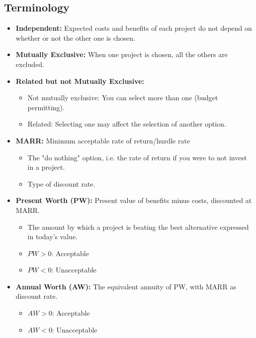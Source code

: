 \subsection{Terminology}
\begin{terminology}
    \begin{itemize}
        \item \textbf{Independent:} Expected costs and benefits of each project do not depend on whether or not the other one is chosen.
        
        \item \textbf{Mutually Exclusive:} When one project is chosen, all the others are excluded.
        
        \item \textbf{Related but not Mutually Exclusive:}
            \begin{itemize}
                \item Not mutually exclusive: You can select more than one (budget permitting).
                \item Related: Selecting one may affect the selection of another option.
            \end{itemize}
        
        \item \textbf{MARR:} Minimum acceptable rate of return/hurdle rate
            \begin{itemize}
                \item The "do nothing" option, i.e. the rate of return if you were to not invest in a project.
                \item Type of discount rate.
            \end{itemize}
        
        \item \textbf{Present Worth (PW):} Present value of benefits minus costs, discounted at MARR.
            \begin{itemize}
                \item The amount by which a project is beating the best alternative expressed in today's value.
                \item $PW > 0$: Acceptable
                \item $PW < 0$: Unacceptable
            \end{itemize}
        
        \item \textbf{Annual Worth (AW):} The equivalent annuity of PW, with MARR as discount rate.
            \begin{itemize}
                \item $AW > 0$: Acceptable
                \item $AW < 0$: Unacceptable
            \end{itemize}
    \end{itemize}            
\end{terminology}

